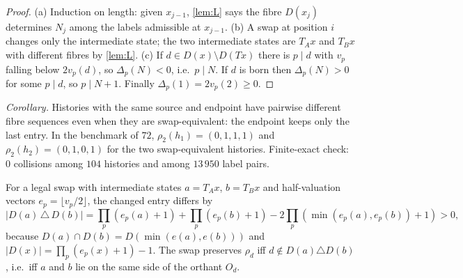 \begin{proof}
(a) Induction on length: given $x_{j-1}$, \cref{lem:L} says the fibre $D(x_j)$ determines $N_j$ among the labels admissible at $x_{j-1}$. (b) A swap at position $i$ changes only the intermediate state; the two intermediate states are $T_Ax$ and $T_Bx$ with different fibres by \cref{lem:L}. (c) If $d\in D(x)\setminus D(Tx)$ there is $p\mid d$ with $v_p$ falling below $2v_p(d)$, so $\Delta_p(N)<0$, i.e.\ $p\mid N$. If $d$ is born then $\Delta_p(N)>0$ for some $p\mid d$, so $p\mid N+1$. Finally $\Delta_p(1)=2v_p(2)\ge0$.
\end{proof}
\emph{Corollary.} Histories with the same source and endpoint have pairwise different fibre sequences even when they are swap-equivalent: the endpoint keeps only the last entry. In the benchmark of $72$, $\rho_2(h_1)=(0,1,1,1)$ and $\rho_2(h_2)=(0,1,0,1)$ for the two swap-equivalent histories. Finite-exact check: $0$ collisions among $104$ histories and among $13\,950$ label pairs.
\begin{proposition}\label{prop:discrepancy}
For a legal swap with intermediate states $a=T_Ax$, $b=T_Bx$ and half-valuation vectors $e_p=\lfloor v_p/2\rfloor$, the changed entry differs by
\[|D(a)\,\triangle\,D(b)|=\prod_p(e_p(a)+1)+\prod_p(e_p(b)+1)-2\prod_p(\min(e_p(a),e_p(b))+1)>0,\]
because $D(a)\cap D(b)=D(\min(e(a),e(b)))$ and $|D(x)|=\prod_p(e_p(x)+1)-1$. The swap preserves $\rho_d$ iff $d\notin D(a)\triangle D(b)$, i.e.\ iff $a$ and $b$ lie on the same side of the orthant $O_d$.
\end{proposition}

